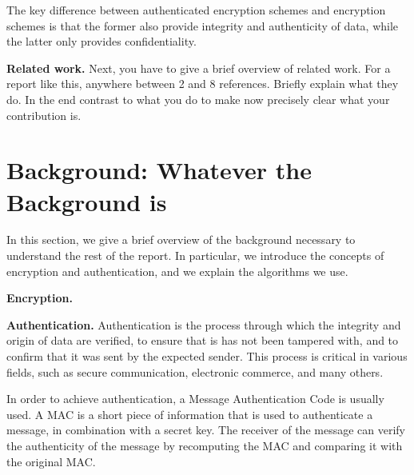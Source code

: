 \documentclass[letterpaper]{article}
\newcommand{\mypar}[1]{{\bf #1.}}
\begin{document}
The key difference between authenticated encryption schemes and encryption schemes
is that the former also provide integrity and authenticity of data, while the latter only provides confidentiality.



\mypar{Related work} Next, you have to give a brief overview of
related work. For a report like this, anywhere between 2 and 8
references. Briefly explain what they do. In the end contrast to what
you do to make now precisely clear what your contribution is.

\section{Background: Whatever the Background is}\label{sec:background}
In this section, we give a brief overview of the background necessary to understand the rest of the report.
In particular, we introduce the concepts of encryption and authentication, and we explain the algorithms we use.

\mypar{Encryption}

\mypar{Authentication}
Authentication is the process through which the integrity and origin of data are verified, to ensure that
is has not been tampered with, and to confirm that it was sent by the expected sender.
This process is critical in various fields, such as secure communication, electronic commerce, and many others.

In order to achieve authentication, a Message Authentication Code is usually used. A MAC is a short piece of information
that is used to authenticate a message, in combination with a secret key. The receiver of the message can verify the authenticity
of the message by recomputing the MAC and comparing it with the original MAC.
\end{document}
